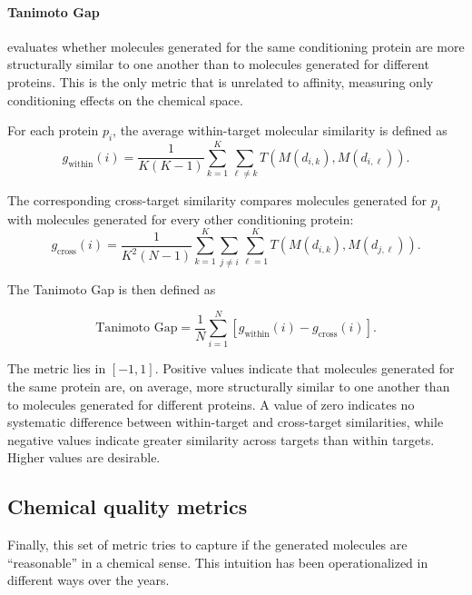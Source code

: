 \documentclass[a4paper,12pt]{article}
\begin{document}
\paragraph{Tanimoto Gap}
evaluates whether molecules generated for the same conditioning protein are more structurally similar to one another than to molecules generated for different proteins. This is the only metric that is unrelated to affinity, measuring only conditioning effects on the chemical space.

For each protein $p_i$, the average within-target molecular similarity is defined as
\begin{equation*}
    g_{\mathrm{within}}(i)
    =
    \frac{1}{K(K-1)}
    \sum_{k=1}^{K}
    \sum_{\ell\neq k}
    T\!\left(
    M(d_{i,k}),
    M(d_{i,\ell})
    \right).
\end{equation*}

The corresponding cross-target similarity compares molecules generated for $p_i$ with molecules generated for every other conditioning protein:
\begin{equation*}
    g_{\mathrm{cross}}(i)
    =
    \frac{1}{K^2(N-1)}
    \sum_{k=1}^{K}
    \sum_{j\neq i}
    \sum_{\ell=1}^{K}
    T\!\left(
    M(d_{i,k}),
    M(d_{j,\ell})
    \right).
\end{equation*}

The Tanimoto Gap is then defined as

\begin{equation*}
    \text{Tanimoto Gap}
    =
    \frac{1}{N}
    \sum_{i=1}^{N}
    \left[
        g_{\mathrm{within}}(i)
        -
        g_{\mathrm{cross}}(i)
        \right].
\end{equation*}

The metric lies in $[-1,1]$. Positive values indicate that molecules generated for the same protein are, on average, more structurally similar to one another than to molecules generated for different proteins. A value of zero indicates no systematic difference between within-target and cross-target similarities, while negative values indicate greater similarity across targets than within targets. Higher values are desirable.

\subsection{Chemical quality metrics}
Finally, this set of metric tries to capture if the generated molecules are ``reasonable'' in a chemical sense. This intuition has been operationalized in different ways over the years.
\end{document}
